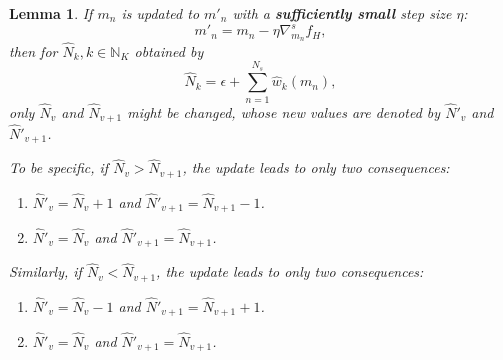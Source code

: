 \documentclass[10pt,journal,compsoc]{IEEEtran}
\newtheorem{lemma}{Lemma}
\begin{document}
\begin{lemma}
\label{lemma:2}
If $m_n$ is updated to $m'_n$ with a \textbf{sufficiently small} step size $\eta$: 
\begin{equation}
    m'_n = m_n - \eta \nabla^s_{m_n} f_H,
\end{equation}
then for $\hat{N}_k, k\in\mathbb{N}_K$ obtained by 
\begin{equation}
    \hat{N}_k = \epsilon + \sum_{n=1}^{N_s} \hat{w}_k(m_n),
\end{equation}
only $\hat{N}_v$ and $\hat{N}_{v+1}$ might be changed, whose new values are denoted by $\hat{N}'_v$ and $\hat{N}'_{v+1}$. 

To be specific, if $\hat{N}_v > \hat{N}_{v+1}$, the update leads to only two consequences:
\begin{enumerate}
    \item $\hat{N}'_v = \hat{N}_v +1$ and $\hat{N}'_{v+1} = \hat{N}_{v+1} -1$.
    \item $\hat{N}'_v = \hat{N}_v$ and $\hat{N}'_{v+1} = \hat{N}_{v+1}$.
\end{enumerate}

Similarly, if $\hat{N}_v < \hat{N}_{v+1}$, the update leads to only two consequences:
\begin{enumerate}
    \item $\hat{N}'_v = \hat{N}_v - 1$ and $\hat{N}'_{v+1} = \hat{N}_{v+1} + 1$.
    \item $\hat{N}'_v = \hat{N}_v$ and $\hat{N}'_{v+1} = \hat{N}_{v+1}$.
\end{enumerate}
\end{lemma}
\end{document}
